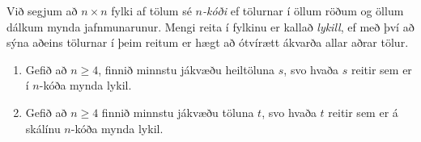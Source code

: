 Við segjum að $n \times n$ fylki af tölum sé \emph{$n$-kóði} ef tölurnar í öllum röðum og öllum dálkum mynda jafnmunarunur. Mengi reita í fylkinu er kallað \emph{lykill}, ef með því að sýna aðeins tölurnar í þeim reitum er hægt að ótvírætt ákvarða allar aðrar tölur.
\begin{enumerate}[label=\alph*.]
\item 
Gefið að $n\ge 4$, finnið minnstu jákvæðu heiltöluna $s$, svo hvaða $s$ reitir sem er í $n$-kóða mynda lykil.
\item
Gefið að $n\ge 4 $ finnið minnstu jákvæðu töluna $t$, svo hvaða $t$ reitir sem er á skálínu $n$-kóða mynda lykil.
\end{enumerate}